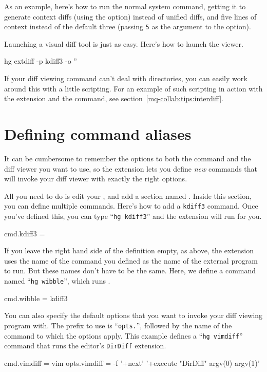 As an example, here's how to run the normal system 
command, getting it to generate context diffs (using the
 option) instead of unified diffs, and five lines of
context instead of the default three (passing \texttt{5} as the
argument to the  option).

Launching a visual diff tool is just as easy.  Here's how to launch
the  viewer.
\begin{codesample2}
  hg extdiff -p kdiff3 -o ''
\end{codesample2}

If your diff viewing command can't deal with directories, you can
easily work around this with a little scripting.  For an example of
such scripting in action with the  extension and the
 command, see
section~\ref{mq-collab:tips:interdiff}.

\section{Defining command aliases}

It can be cumbersome to remember the options to both the
 command and the diff viewer you want to use,
so the  extension lets you define \emph{new} commands
that will invoke your diff viewer with exactly the right options.

All you need to do is edit your \hgrc, and add a section named
.  Inside this section, you can define multiple
commands.  Here's how to add a \texttt{kdiff3} command.  Once you've
defined this, you can type ``\texttt{hg kdiff3}'' and the
 extension will run  for you.
\begin{codesample2}
  [extdiff]
  cmd.kdiff3 =
\end{codesample2}
If you leave the right hand side of the definition empty, as above,
the  extension uses the name of the command you defined
as the name of the external program to run.  But these names don't
have to be the same.  Here, we define a command named ``\texttt{hg
  wibble}'', which runs .
\begin{codesample2}
  [extdiff]
  cmd.wibble = kdiff3
\end{codesample2}

You can also specify the default options that you want to invoke your
diff viewing program with.  The prefix to use is ``\texttt{opts.}'',
followed by the name of the command to which the options apply.  This
example defines a ``\texttt{hg vimdiff}'' command that runs the
 editor's \texttt{DirDiff} extension.
\begin{codesample2}
  [extdiff]  
  cmd.vimdiff = vim
  opts.vimdiff = -f '+next' '+execute "DirDiff" argv(0) argv(1)'
\end{codesample2}

